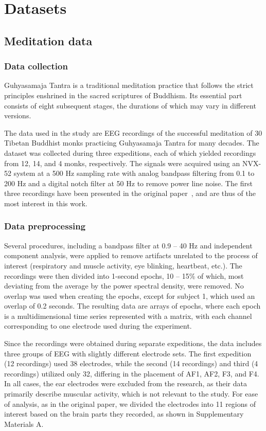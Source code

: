 \documentclass[journal,twoside,web]{ieeecolor2}
\begin{document}
\section{Datasets}

\subsection{Meditation data}

\subsubsection{Data collection}

Guhyasamaja Tantra is a traditional meditation practice that follows the strict principles enshrined in the sacred scriptures of Buddhism. Its essential part consists of eight subsequent stages, the durations of which may vary in different versions.

The data used in the study are EEG recordings of the successful meditation of 30 Tibetan Buddhist monks practicing Guhyasamaja Tantra for many decades. The dataset was collected during three expeditions, each of which yielded recordings from 12, 14, and 4 monks, respectively. The signals were acquired using an NVX-52 system at a 500 Hz sampling rate with analog bandpass filtering from 0.1 to 200 Hz and a digital notch filter at 50 Hz to remove power line noise. The first three recordings have been presented in the original paper~\cite{SDA}, and are thus of the most interest in this work. 

\subsubsection{Data preprocessing}

Several procedures, including a bandpass filter at 0.9 -- 40 Hz and independent component analysis, were applied to remove artifacts unrelated to the process of interest (respiratory and muscle activity, eye blinking, heartbeat, etc.). The recordings were then divided into 1-second epochs, 10 -- 15\% of which, most deviating from the average by the power spectral density, were removed. No overlap was used when creating the epochs, except for subject 1, which used an overlap of 0.2 seconds. The resulting data are arrays of epochs, where each epoch is a multidimensional time series represented with a matrix, with each channel corresponding to one electrode used during the experiment.

Since the recordings were obtained during separate expeditions, the data includes three groups of EEG with slightly different electrode sets. The first expedition (12 recordings) used 38 electrodes, while the second (14 recordings) and third (4 recordings) utilized only 32, differing in the placement of AF1, AF2, F3, and F4. In all cases, the ear electrodes were excluded from the research, as their data primarily describe muscular activity, which is not relevant to the study. For ease of analysis, as in the original paper, we divided the electrodes into 11 regions of interest based on the brain parts they recorded, as shown in Supplementary Materials A.
\end{document}
